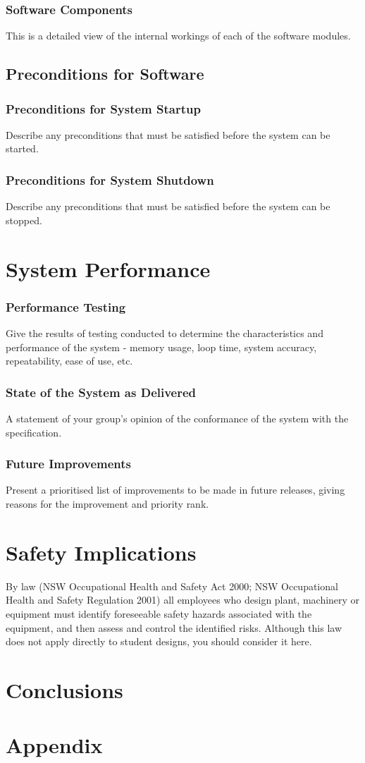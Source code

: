 \documentclass[11pt,a4paper]{article}
\begin{document}
\subsubsection{Software Components}
This is a detailed view of the internal workings of each of the software modules.

\subsection{Preconditions for Software}
\subsubsection{Preconditions for System Startup}
Describe any preconditions that must be satisfied before the system can be started.
\subsubsection{Preconditions for System Shutdown}
Describe any preconditions that must be satisfied before the system can be stopped.
\section{System Performance}
\subsubsection{Performance Testing}
Give the results of testing conducted to determine the characteristics and performance of the system - memory usage, loop time, system accuracy, repeatability, ease of use, etc.
\subsubsection{State of the System as Delivered}
A statement of your group’s opinion of the conformance of the system with the specification.
\subsubsection{Future Improvements}
Present a prioritised list of improvements to be made in future releases, giving reasons for the improvement and priority rank.

\section{Safety Implications}
By law (NSW Occupational Health and Safety Act 2000; NSW Occupational Health and Safety
Regulation 2001) all employees who design plant, machinery or equipment must identify foreseeable safety hazards associated with the equipment, and then assess and control the identified risks. Although this law does not apply directly to student designs, you should consider it here.



\section{Conclusions}

\newpage




\newpage
\section{Appendix}
\end{document}
